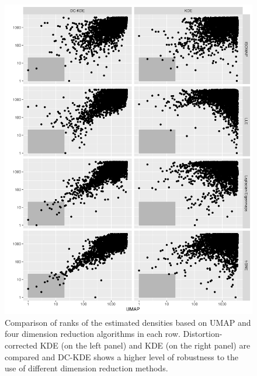 \documentclass[12pt]{article}
\begin{document}
\begin{figure}

{\centering \includegraphics[width=0.9\linewidth]{figures/Electricity_2d_rankplot_3639id_umapvs4ml_radius20_r180} 

}

\caption{Comparison of ranks of the estimated densities based on UMAP and four dimension reduction algorithms in each row. Distortion-corrected KDE (on the left panel) and KDE (on the right panel) are compared and DC-KDE shows a higher level of robustness to the use of different dimension reduction methods.}\label{fig:electricityrank}
\end{figure}
\end{document}

